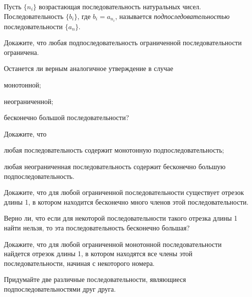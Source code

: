 \documentclass[a4paper, 12pt, num=25]{listok}
\begin{document}
\begin{definition}
	Пусть $\{n_i\}$  возрастающая последовательность натуральных чисел.
	Последовательность $\{b_i\}$, где $b_i = a_{n_i}$, называется \textit{подпоследовательностью} последовательности $\{a_n\}$.
\end{definition}
\begin{problem}
\begin{probparts}
	\item Докажите, что любая подпоследовательность ограниченной последовательности ограничена.
\end{probparts}
	Останется ли верным аналогичное утверждение в случае
	\begin{probparts}[resume]
		\item монотонной;
		\item неограниченной;
		\item бесконечно большой последовательности?
	\end{probparts}
\end{problem}
\begin{problem}
	Докажите, что
	\begin{probparts}
		\item любая последовательность содержит монотонную подпоследовательность;
		\item любая неограниченная последовательность содержит бесконечно большую подпоследовательность.
	\end{probparts}
\end{problem}
\begin{problem}
\begin{probparts}
	\item Докажите, что для любой ограниченной последовательности существует отрезок длины 1,
	в котором находится бесконечно много членов этой последовательности.
	\item Верно ли, что если для некоторой последовательности такого отрезка длины 1 найти нельзя, то эта последовательность  бесконечно большая?
\end{probparts}
\end{problem}
\begin{problem}
	Докажите, что для любой ограниченной монотонной последовательности найдется отрезок длины 1,
	в котором находятся все члены этой последовательности, начиная с некоторого номера.
\end{problem}
\begin{problem}
	Придумайте две различные последовательности, являющиеся подпоследовательностями друг друга.
\end{problem}
\end{document}
